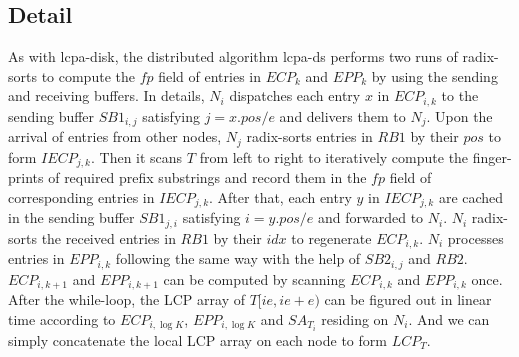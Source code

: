 \documentclass[article]{IEEEtran}
\theoremstyle{definition}
\theoremstyle{remark}
\numberwithin{equation}{section}
\begin{document}
\subsection{Detail}

As with lcpa-disk, the distributed algorithm lcpa-ds performs two runs of radix-sorts to compute the $fp$ field of entries in $ECP_k$ and $EPP_k$ by using the sending and receiving buffers. In details, $N_i$ dispatches each entry $x$ in $ECP_{i,k}$ to the sending buffer $SB1_{i,j}$ satisfying $j = x.pos / e$ and delivers them to $N_j$. Upon the arrival of entries from other nodes, $N_j$ radix-sorts entries in $RB1$ by their $pos$ to form $IECP_{j,k}$. Then it scans $T$ from left to right to iteratively compute the finger-prints of required prefix substrings and record them in the $fp$ field of corresponding entries in $IECP_{j,k}$. After that, each entry $y$ in $IECP_{j,k}$ are cached in the sending buffer $SB1_{j,i}$ satisfying $i = y.pos /e$ and forwarded to $N_i$. $N_i$ radix-sorts the received entries in $RB1$ by their $idx$ to regenerate $ECP_{i,k}$. $N_i$ processes entries in $EPP_{i,k}$ following the same way with the help of $SB2_{i,j}$ and $RB2$. $ECP_{i,k+1}$ and $EPP_{i,k+1}$ can be computed by scanning $ECP_{i,k}$ and $EPP_{i,k}$ once. After the while-loop, the LCP array of $T[ie,ie+e)$ can be figured out in linear time according to $ECP_{i,{\log K}}$, $EPP_{i,{\log K}}$ and $SA_{T_i}$ residing on $N_i$. And we can simply concatenate the local LCP array on each node to form $LCP_T$.
\end{document}
